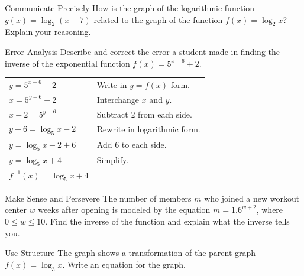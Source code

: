 \documentclass{article}
\newenvironment{practice}[2]{}{}        %
\newcommand{\answer}[1]{}               %
\begin{document}
\begin{practice}{10}{2}
Communicate Precisely How is the graph of the logarithmic function $g(x)=\log_2(x-7)$ related to the graph of the function $f(x)=\log_2 x$? Explain your reasoning.
\answer{$g(x)$ is shifted 7 units to the right; for each $x$, $g(x)=f(x-7)$, so the $y$-values of the functions are equal for $x$-values that are 7 units apart.}
\end{practice}

\begin{practice}{11}{2}
Error Analysis Describe and correct the error a student made in finding the inverse of the exponential function $f(x)=5^{x-6}+2$.

\begin{center}
\begin{tabular}{ll}
$y=5^{x-6}+2$ & Write in $y=f(x)$ form. \\
$x=5^{y-6}+2$ & Interchange $x$ and $y$. \\
$x-2=5^{y-6}$ & Subtract 2 from each side. \\
$y-6=\log_5x-2$ & Rewrite in logarithmic form. \\
$y=\log_5x-2+6$ & Add 6 to each side. \\
$y=\log_5x+4$ & Simplify. \\
$f^{-1}(x)=\log_5x+4$ & \\
\end{tabular}
\end{center}

\answer{When rewriting in logarithmic form, the student should have placed the expression $x-2$ in parenthesis. The correct inverse function is $f^{-1}(x)=\log_5(x-2)+6$.}
\end{practice}

\begin{practice}{12}{1}
Make Sense and Persevere The number of members $m$ who joined a new workout center $w$ weeks after opening is modeled by the equation $m=1.6^{w+2}$, where $0\le w\le10$. Find the inverse of the function and explain what the inverse tells you.
\answer{$w=\log_{1.6}m-2$; the number of weeks after opening when the number of members reaches $m$.}
\end{practice}

\begin{practice}{13}{1}
Use Structure The graph shows a transformation of the parent graph $f(x)=\log_3 x$. Write an equation for the graph.

\begin{center}
\end{center}

\answer{$g(x)=\log_3(x-2)+1$}
\end{practice}
\end{document}
